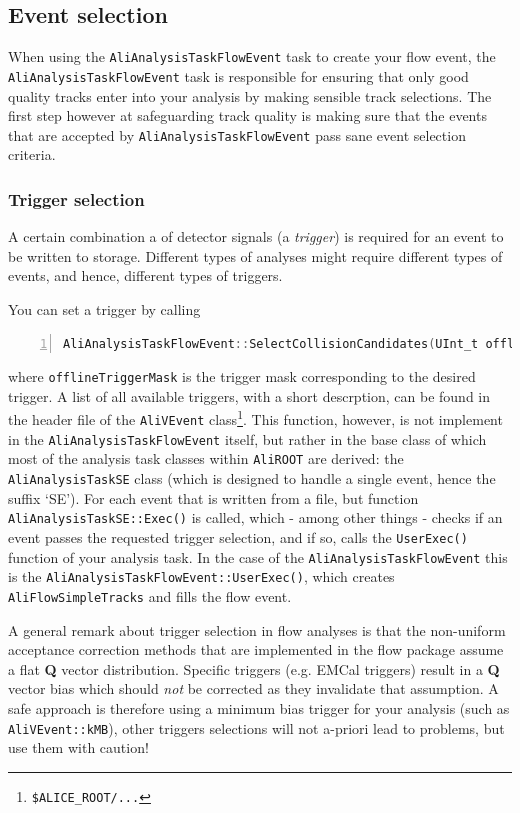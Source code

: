\documentclass[a4paper]{book}
\numberwithin{equation}{subsection}
\begin{document}
\subsection{Event selection}
When using the \texttt{AliAnalysisTaskFlowEvent} task to create your flow event, the \texttt{AliAnalysisTaskFlowEvent} task is responsible for ensuring that only good quality tracks enter into your analysis by making sensible track selections. The first step however at safeguarding track quality is making sure that the events that are accepted by \texttt{AliAnalysisTaskFlowEvent} pass sane event selection criteria. 

\subsubsection{Trigger selection}
A certain combination a of detector signals (a \emph{trigger}) is required for an event to be written to storage. Different types of analyses might require different types of events, and hence, different types of triggers. 

You can set a trigger by calling
\begin{lstlisting}[language=C, numbers=left]
AliAnalysisTaskFlowEvent::SelectCollisionCandidates(UInt_t offlineTriggerMask);\end{lstlisting}
where \texttt{offlineTriggerMask} is the trigger mask corresponding to the desired trigger. A list of all available triggers, with a short descrption, can be found in the header file of the \texttt{AliVEvent} class\footnote{\texttt{\$ALICE\_ROOT/...}}. This function, however, is not implement in the \texttt{AliAnalysisTaskFlowEvent} itself, but rather in the base class of which most of the analysis task classes within \texttt{AliROOT} are derived: the \texttt{AliAnalysisTaskSE} class (which is designed to handle a single event, hence the suffix `SE'). For each event that is written from a file, but function \texttt{AliAnalysisTaskSE::Exec()} is called, which - among other things - checks if an event passes the requested trigger selection, and if so, calls the \texttt{UserExec()} function of your analysis task. In the case of the \texttt{AliAnalysisTaskFlowEvent} this is the \texttt{AliAnalysisTaskFlowEvent::UserExec()}, which creates \texttt{AliFlowSimpleTracks} and fills the flow event. 

A general remark about trigger selection in flow analyses is that the non-uniform acceptance correction methods that are implemented in the flow package assume a flat \textbf{Q} vector distribution. Specific triggers (e.g. EMCal triggers) result in a \textbf{Q} vector bias which should \emph{not} be corrected as they invalidate that assumption. A safe approach is therefore using a minimum bias trigger for your analysis (such as \texttt{AliVEvent::kMB}), other triggers selections will not a-priori lead to problems, but use them with caution!
\end{document}
